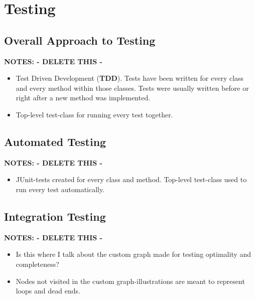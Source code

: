 \chapter{Testing}




\section{Overall Approach to Testing}
\textbf{NOTES: - DELETE THIS -}
\begin{itemize}
	\item Test Driven Development (\textbf{TDD}).
	\subitem Tests have been written for every class and every method within those classes.
	\subitem Tests were usually written before or right after a new method was implemented.
	\item Top-level test-class for running every test together.
\end{itemize}


\section{Automated Testing}
\textbf{NOTES: - DELETE THIS -}
\begin{itemize}
	\item JUnit-tests created for every class and method. Top-level test-class used to run every test automatically.
\end{itemize}


\section{Integration Testing}
\textbf{NOTES: - DELETE THIS -}
\begin{itemize}
	\item Is this where I talk about the custom graph made for testing optimality and completeness?
	\item Nodes not visited in the custom graph-illustrations are meant to represent loops and dead ends.
\end{itemize}

